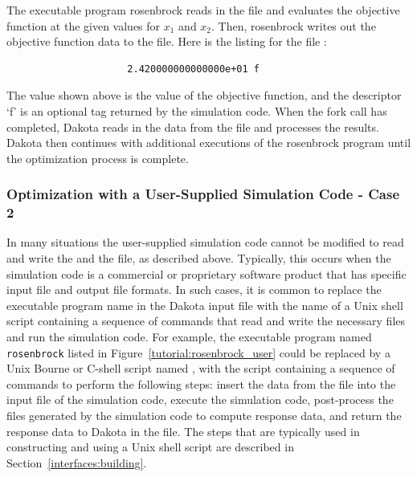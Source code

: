 The executable program rosenbrock reads in the 
file and evaluates the objective function at the given values for
$x_1$ and $x_2$. Then, rosenbrock writes out
the objective function data to the  file. Here
is the listing for the file :
\begin{small}
\begin{verbatim}
                     2.420000000000000e+01 f
\end{verbatim}
\end{small}

The value shown above is the value of the objective function, and the
descriptor `f' is an optional tag returned by the simulation code.
When the fork call has completed, Dakota reads in the data from the
 file and processes the results. Dakota then
continues with additional executions of the rosenbrock program until
the optimization process is complete.

\subsubsection{Optimization with a User-Supplied Simulation Code - Case 2}\label{tutorial:examples:user_supply:optimization2}

In many situations the user-supplied simulation code cannot be
modified to read and write the  and the
 file, as described above. Typically, this
occurs when the simulation code is a commercial or proprietary
software product that has specific input file and output file formats.
In such cases, it is common to replace the executable program name in
the Dakota input file with the name of a Unix shell script containing
a sequence of commands that read and write the necessary files and run
the simulation code. For example, the executable program named
\texttt{rosenbrock} listed in Figure~\ref{tutorial:rosenbrock_user}
could be replaced by a Unix Bourne or C-shell script named
, with the script containing a sequence of
commands to perform the following steps: insert the data from the
 file into the input file of the simulation
code, execute the simulation code, post-process the files generated by
the simulation code to compute response data, and return the response
data to Dakota in the  file. The steps that are
typically used in constructing and using a Unix shell script are
described in Section~\ref{interfaces:building}.

